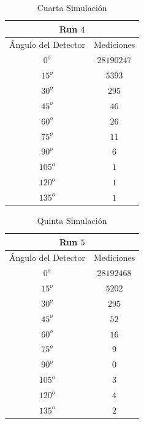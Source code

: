 \documentclass[conference]{IEEEtran}
\begin{document}
\begin{table}[H]
	\centering
	\caption{Cuarta Simulación}
	\begin{tabular}{||c|c||}
	\hline
	\hline
	\multicolumn{2}{||c||}{Run $4$} \\
	\hline
	\hline
	Ángulo del Detector & Mediciones \\
	\hline
	$0^o$   & $28190247$ \\
	$15^o$  & $5393$     \\
	$30^o$  & $295$      \\ 
	$45^o$  & $46$       \\
	$60^o$  & $26$       \\
	$75^o$  & $11$        \\
	$90^o$  & $6$        \\
	$105^o$ & $1$        \\
	$120^o$ & $1$        \\
	$135^o$ & $1$        \\
	\hline
	\hline
	\end{tabular}
\end{table}




\begin{table}[H]
	\centering
	\caption{Quinta Simulación}
	\begin{tabular}{||c|c||}
	\hline
	\hline
	\multicolumn{2}{||c||}{Run $5$} \\
	\hline
	\hline
	Ángulo del Detector & Mediciones \\
	\hline
	$0^o$   & $28192468$ \\
	$15^o$  & $5202$     \\
	$30^o$  & $295$      \\ 
	$45^o$  & $52$       \\
	$60^o$  & $16$       \\
	$75^o$  & $9$        \\
	$90^o$  & $0$        \\
	$105^o$ & $3$        \\
	$120^o$ & $4$        \\
	$135^o$ & $2$        \\
	\hline
	\hline
	\end{tabular}
\end{table}
\end{document}
